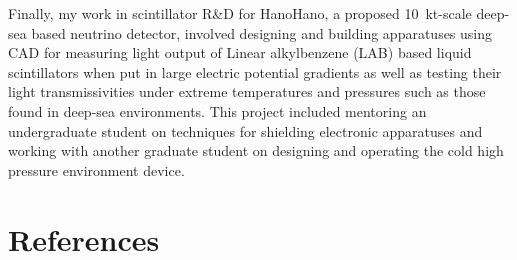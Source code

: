 \documentclass[10pt]{article} %
\begin{document}
Finally, my work in scintillator R\&D for HanoHano, a proposed
\SI{10}{\kilo\tonne}-scale deep-sea based neutrino detector, involved designing
and building apparatuses using CAD for measuring light output of Linear
alkylbenzene (LAB) based liquid scintillators when put in large electric
potential gradients as well as testing their light transmissivities under
extreme temperatures and pressures such as those found in deep-sea
environments. This project included mentoring an undergraduate student on
techniques for shielding electronic apparatuses and working with another
graduate student on designing and operating the cold high pressure environment
device.



\clearpage
\section{References}
\end{document}
